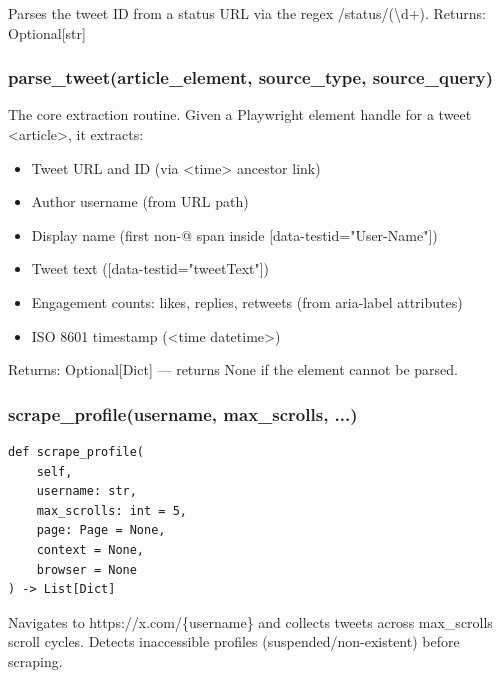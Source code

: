 \documentclass[11pt, a4paper]{article}
\def\method#1{#1}%
\def\param#1{#1}%
\def\returns#1{Returns: #1}%
\def\texttt#1{#1}%
\def\color#1{}%
\newcommand{\method}[1]{\texttt{\color{TwBlue}#1}}
\newcommand{\param}[1]{\texttt{\color{TwGreen!70!black}#1}}
\newcommand{\returns}[1]{\textbf{Returns:} \texttt{#1}}
\begin{document}
Parses the tweet ID from a status URL via the regex
\texttt{/status/(\textbackslash d+)}. \returns{Optional[str]}

\subsubsection{\texorpdfstring{\method{parse\_tweet(article\_element, source\_type, source\_query)}}{}}

The core extraction routine. Given a Playwright element handle for a tweet
\texttt{<article>}, it extracts:

\begin{itemize}[leftmargin=1.6em, itemsep=3pt]
  \item Tweet URL and ID (via \texttt{<time>} ancestor link)
  \item Author username (from URL path)
  \item Display name (first non-\texttt{@} span inside \texttt{[data-testid="User-Name"]})
  \item Tweet text (\texttt{[data-testid="tweetText"]})
  \item Engagement counts: likes, replies, retweets (from \texttt{aria-label} attributes)
  \item ISO 8601 timestamp (\texttt{<time datetime>})
\end{itemize}

\returns{Optional[Dict]} --- returns \texttt{None} if the element cannot be parsed.

\subsubsection{\texorpdfstring{\method{scrape\_profile(username, max\_scrolls, ...)}}{}}

\begin{tcolorbox}[pybox, title={\texttt{scrape\_profile}}]
\begin{lstlisting}[style=pycode]
def scrape_profile(
    self,
    username: str,
    max_scrolls: int = 5,
    page: Page = None,
    context = None,
    browser = None
) -> List[Dict]
\end{lstlisting}
\end{tcolorbox}

Navigates to \texttt{https://x.com/\{username\}} and collects tweets across
\param{max\_scrolls} scroll cycles.  Detects inaccessible profiles
(suspended/non-existent) before scraping.
\end{document}
